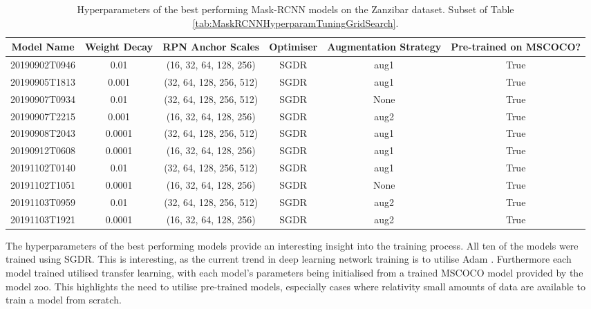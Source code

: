 \begin{table}[!ht]
	\tiny
	\begin{adjustbox}{width=\columnwidth, center}
		\begin{tabular}{cccccc}
			\toprule
			Model Name & Weight Decay &        RPN Anchor Scales & Optimiser & Augmentation Strategy & Pre-trained on MSCOCO? \\
			\midrule
				20190902T0946 &         0.01 &   (16, 32, 64, 128, 256) &      SGDR &                  aug1 &                  True \\
				20190905T1813 &        0.001 &  (32, 64, 128, 256, 512) &      SGDR &                  aug1 &                  True \\
				20190907T0934 &         0.01 &  (32, 64, 128, 256, 512) &      SGDR &                  None &                  True \\
				20190907T2215 &        0.001 &   (16, 32, 64, 128, 256) &      SGDR &                  aug2 &                  True \\
				20190908T2043 &       0.0001 &  (32, 64, 128, 256, 512) &      SGDR &                  aug1 &                  True \\
				20190912T0608 &       0.0001 &   (16, 32, 64, 128, 256) &      SGDR &                  aug1 &                  True \\
				20191102T0140 &         0.01 &  (32, 64, 128, 256, 512) &      SGDR &                  aug1 &                  True \\
				20191102T1051 &       0.0001 &   (16, 32, 64, 128, 256) &      SGDR &                  None &                  True \\
				20191103T0959 &         0.01 &  (32, 64, 128, 256, 512) &      SGDR &                  aug2 &                  True \\
				20191103T1921 &       0.0001 &   (16, 32, 64, 128, 256) &      SGDR &                  aug2 &                  True \\
			\bottomrule
		\end{tabular}
	\end{adjustbox}
	\caption{Hyperparameters of the best performing Mask-RCNN models on the Zanzibar dataset. Subset of Table \ref{tab:MaskRCNNHyperparamTuningGridSearch}.}
	\label{tab:best-mask-rcnn-models}
\end{table}

The hyperparameters of the best performing models provide an interesting insight into the training process. All ten of the models were trained using SGDR. This is interesting, as the current trend in deep learning network training is to utilise Adam \cite{karpathy_peek_2017}. Furthermore each model trained utilised transfer learning, with each model's parameters being initialised from a trained MSCOCO model provided by the model zoo. This highlights the need to utilise pre-trained models, especially cases where relativity small amounts of data are available to train a model from scratch. 

